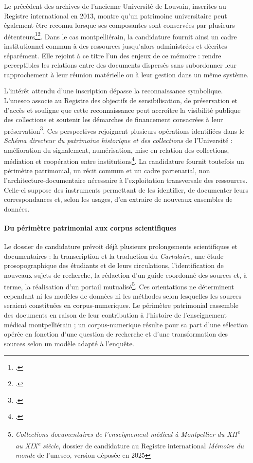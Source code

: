 Le précédent des archives de l'ancienne Université de Louvain, inscrites au Registre international en 2013, montre qu'un patrimoine universitaire peut également être reconnu lorsque ses composantes sont conservées par plusieurs détenteurs\footcite{UNESCOLouvain}\footcite{ArchivesEtatLouvain2014}. Dans le cas montpelliérain, la candidature fournit ainsi un cadre institutionnel commun à des ressources jusqu'alors administrées et décrites séparément. Elle rejoint à ce titre l'un des enjeux de ce mémoire : rendre perceptibles les relations entre des documents dispersés sans subordonner leur rapprochement à leur réunion matérielle ou à leur gestion dans un même système.

L'intérêt attendu d'une inscription dépasse la reconnaissance symbolique. L'\gls{unesco} associe au Registre des objectifs de sensibilisation, de préservation et d'accès et souligne que cette reconnaissance peut accroître la visibilité publique des collections et soutenir les démarches de financement consacrées à leur préservation\footcite{UNESCOAppel2026_2027}. Ces perspectives rejoignent plusieurs opérations identifiées dans le \emph{Schéma directeur du patrimoine historique et des collections} de l'Université : amélioration du \gls{signalement}, numérisation, mise en relation des collections, médiation et coopération entre institutions\footcite{UMSchemaDirecteurPatrimoine2025}. La candidature fournit toutefois un périmètre patrimonial, un récit commun et un cadre partenarial, non l'\gls{architecture-documentaire} nécessaire à l'exploitation transversale des ressources. Celle-ci suppose des instruments permettant de les identifier, de documenter leurs correspondances et, selon les usages, d'en extraire de nouveaux ensembles de données.


\paragraph{Du périmètre patrimonial aux corpus scientifiques}

Le dossier de candidature prévoit déjà plusieurs prolongements scientifiques et documentaires : la transcription et la traduction du \emph{Cartulaire}, une étude prosopographique des étudiants et de leurs circulations, l'identification de nouveaux sujets de recherche, la rédaction d'un guide coordonné des sources et, à terme, la réalisation d'un portail mutualisé\footnote{\emph{Collections documentaires de l'enseignement médical à Montpellier du XII\textsuperscript{e} au XIX\textsuperscript{e} siècle}, dossier de candidature au Registre international \emph{Mémoire du monde} de l'\gls{unesco}, version déposée en 2025}. Ces orientations ne déterminent cependant ni les modèles de données ni les méthodes selon lesquelles les sources seraient constituées en \glspl{corpus-numerique}. Le périmètre patrimonial rassemble des documents en raison de leur contribution à l'histoire de l'enseignement médical montpelliérain ; un \gls{corpus-numerique} résulte pour sa part d'une sélection opérée en fonction d'une question de recherche et d'une transformation des sources selon un modèle adapté à l'enquête.

